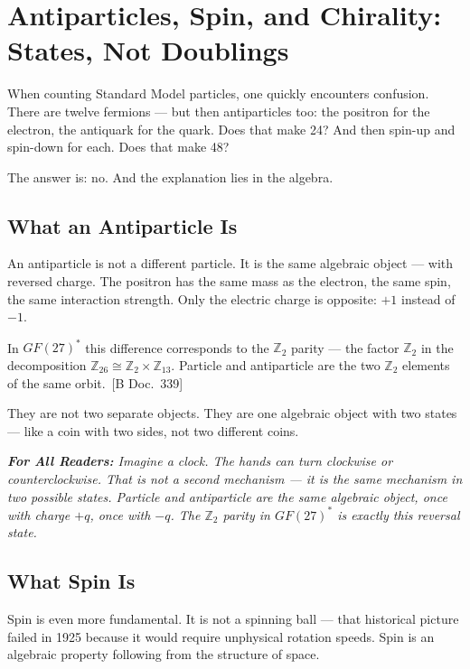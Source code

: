 \documentclass[11pt,oneside]{book}
\newcommand{\status}[1]{\penalty10000\,{\scriptsize\textcolor{gray!60}{[#1]}}}
\newenvironment{laierspur}{%
  \par\vspace{4pt}%
  \noindent\small\itshape\color{blue!60!black}%
  \textbf{For All Readers:}\enspace\ignorespaces}{%
  \par\vspace{4pt}\normalsize\normalfont\normalcolor}
\begin{document}
\chapter{Antiparticles, Spin, and Chirality: States, Not Doublings}

When counting Standard Model particles, one quickly encounters confusion.
There are twelve fermions --- but then antiparticles too: the positron
for the electron, the antiquark for the quark. Does that make 24?
And then spin-up and spin-down for each. Does that make 48?

The answer is: no. And the explanation lies in the algebra.

\section*{What an Antiparticle Is}

An antiparticle is not a different particle. It is the same algebraic
object --- with reversed charge. The positron has the same mass as the
electron, the same spin, the same interaction strength. Only the electric
charge is opposite: $+1$ instead of $-1$.

In $GF(27)^*$ this difference corresponds to the $\mathbb{Z}_2$ parity ---
the factor $\mathbb{Z}_2$ in the decomposition $\mathbb{Z}_{26} \cong
\mathbb{Z}_2 \times \mathbb{Z}_{13}$. Particle and antiparticle are the
two $\mathbb{Z}_2$ elements of the same orbit. \status{B Doc.~339}

They are not two separate objects. They are one algebraic object with
two states --- like a coin with two sides, not two different coins.

\begin{laierspur}
Imagine a clock. The hands can turn clockwise or counterclockwise.
That is not a second mechanism --- it is the same mechanism in two
possible states. Particle and antiparticle are the same algebraic
object, once with charge $+q$, once with $-q$. The $\mathbb{Z}_2$
parity in $GF(27)^*$ is exactly this reversal state.
\end{laierspur}

\section*{What Spin Is}

Spin is even more fundamental. It is not a spinning ball --- that
historical picture failed in 1925 because it would require
unphysical rotation speeds. Spin is an algebraic property following
from the structure of space.
\end{document}
